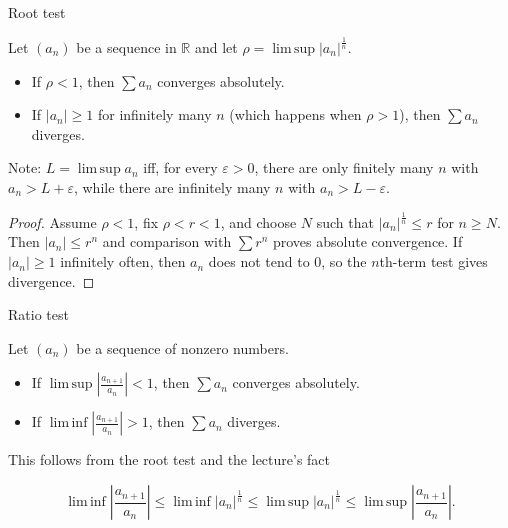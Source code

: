 \begin{theorem}{Root test}

Let \(\left( a_{n} \right)\) be a sequence in \(\mathbb{R}\) and let \(\rho = \operatorname{lim\, sup}\left| a_{n} \right|^{\frac{1}{n}}\).

\begin{itemize}
\tightlist
\item
  If \(\rho < 1\), then \(\sum a_{n}\) converges absolutely.
\item
  If \(\left| a_{n} \right| \geq 1\) for infinitely many \(n\) (which happens when \(\rho > 1\)), then \(\sum a_{n}\) diverges.
\end{itemize}

Note: \(L = \operatorname{lim\, sup}a_{n}\) iff, for every \(\varepsilon > 0\), there are only finitely many \(n\) with \(a_{n} > L + \varepsilon\), while there are infinitely many \(n\) with \(a_{n} > L - \varepsilon\).

\end{theorem}

\begin{proof}

Assume \(\rho < 1\), fix \(\rho < r < 1\), and choose \(N\) such that \(\left| a_{n} \right|^{\frac{1}{n}} \leq r\) for \(n \geq N\). Then \(\left| a_{n} \right| \leq r^{n}\) and comparison with \(\sum r^{n}\) proves absolute convergence. If \(\left| a_{n} \right| \geq 1\) infinitely often, then \(a_{n}\) does not tend to \(0\), so the \(n\)th-term test gives divergence.

\end{proof}

\begin{theorem}{Ratio test}

Let \(\left( a_{n} \right)\) be a sequence of nonzero numbers.

\begin{itemize}
\tightlist
\item
  If \(\operatorname{lim\, sup}\left| \frac{a_{n + 1}}{a_{n}} \right| < 1\), then \(\sum a_{n}\) converges absolutely.
\item
  If \(\operatorname{lim\, inf}\left| \frac{a_{n + 1}}{a_{n}} \right| > 1\), then \(\sum a_{n}\) diverges.
\end{itemize}

This follows from the root test and the lecture's fact

\[\operatorname{lim\, inf}\left| \frac{a_{n + 1}}{a_{n}} \right| \leq \operatorname{lim\, inf}\left| a_{n} \right|^{\frac{1}{n}} \leq \operatorname{lim\, sup}\left| a_{n} \right|^{\frac{1}{n}} \leq \operatorname{lim\, sup}\left| \frac{a_{n + 1}}{a_{n}} \right|.\]

\end{theorem}

